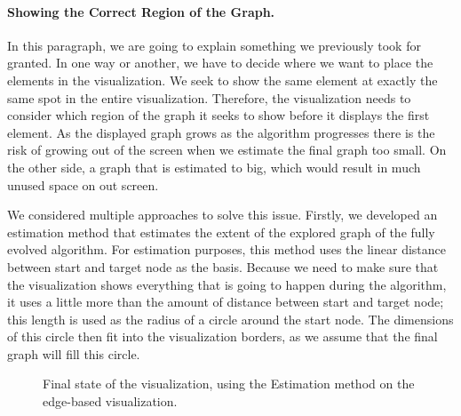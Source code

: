 \documentclass
[
    paper = a4,
    pagesize,
    12 pt,
    oneside,                       %
    open = right,
    DIV = calc,
    BCOR = 0 mm,                   %
    bibtotoc
]
{scrbook}
\begin{document}
\paragraph{Showing the Correct Region of the Graph.}
In this paragraph, we are going to explain something we previously took for granted.
In one way or another, we have to decide where we want to place the elements in the visualization.
We seek to show the same element at exactly the same spot in the entire visualization.
Therefore, the visualization needs to consider which region of the graph it seeks to show before it displays the first element.
As the displayed graph grows as the algorithm progresses there is the risk of growing out of the screen when we estimate the final graph too small.
On the other side, a graph that is estimated to big, which would result in much unused space on out screen.

%

We considered multiple approaches to solve this issue.
Firstly, we developed an estimation method that estimates the extent of the explored graph of the fully evolved algorithm.
For estimation purposes, this method uses the linear distance between start and target node as the basis.
Because we need to make sure that the visualization shows everything that is going to happen during the algorithm, it uses a little more than the amount of distance between start and target node; this length is used as the radius of a circle around the start node.
The dimensions of this circle then fit into the visualization borders, as we assume that the final graph will fill this circle.

\begin{figure}
\caption[]{Final state of the visualization, using the Estimation method on the edge-based visualization.}
\label{fig:estimation}
\end{figure}
\end{document}
